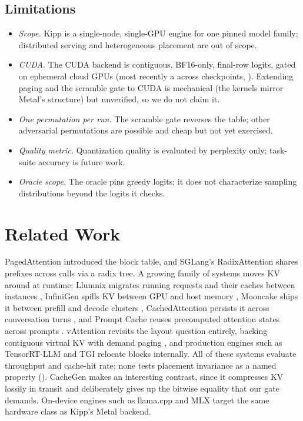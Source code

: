 \documentclass[sigconf,nonacm,screen]{acmart}
\begin{document}
\subsection{Limitations}
\label{sec:limitations}
\begin{itemize}\itemsep2pt
  \item \emph{Scope.} Kipp is a single-node, single-GPU engine for one
  pinned model family; distributed serving and heterogeneous placement are
  out of scope.
  \item \emph{CUDA.} The CUDA backend is contiguous, BF16-only, final-row
  logits, gated on ephemeral cloud GPUs (most recently a \CudaGpuName{}
  across \CudaCheckpointCount{} checkpoints, ).
  Extending paging and the scramble gate to CUDA
  is mechanical (the kernels mirror Metal's structure) but unverified, so we
  do not claim it.
  \item \emph{One permutation per run.} The scramble gate reverses the
  table; other adversarial permutations are possible and cheap but not yet
  exercised.
  \item \emph{Quality metric.} Quantization quality is evaluated by
  perplexity only; task-suite accuracy \citep{li2024evalquant} is future
  work.
  \item \emph{Oracle scope.} The oracle pins greedy logits; it does not
  characterize sampling distributions beyond the logits it checks.
\end{itemize}

\section{Related Work}
\label{sec:related}
PagedAttention \citep{kwon2023pagedattention} introduced the block table,
and SGLang's RadixAttention \citep{zheng2024sglang} shares prefixes across
calls via a radix tree. A growing family of systems moves KV around at
runtime: Llumnix migrates running requests and their caches between
instances \citep{sun2024llumnix}, InfiniGen spills KV between GPU and host
memory \citep{lee2024infinigen}, Mooncake ships it between prefill and
decode clusters \citep{qin2025mooncake}, CachedAttention persists it across
conversation turns \citep{gao2024cachedattention}, and Prompt Cache reuses
precomputed attention states across prompts \citep{gim2024promptcache}.
vAttention revisits the layout question entirely, backing contiguous virtual
KV with demand paging \citep{prabhu2025vattention}, and production engines
such as TensorRT-LLM \citep{nvidia2023tensorrtllm} and TGI
\citep{huggingface2023tgi} relocate blocks internally. All of these systems
evaluate throughput and cache-hit rate; none tests placement invariance as a
named property (). CacheGen \citep{liu2024cachegen}
makes an interesting contrast, since it compresses KV lossily in transit and
deliberately gives up the bitwise equality that our gate demands. On-device
engines such as llama.cpp \citep{llamacpp2023gguf} and MLX
\citep{hannun2023mlx} target the same hardware class as Kipp's Metal
backend.
\end{document}
